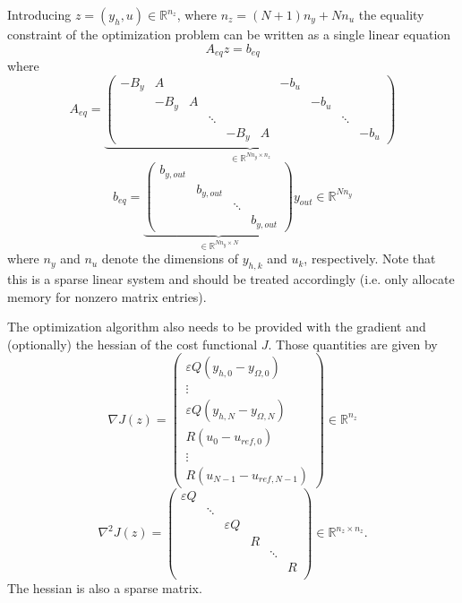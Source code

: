 \documentclass[
12pt, %
a4paper, %
onecolumn, %
portrait %
]{article}
\begin{document}
Introducing $z = (y_h, u) \in \mathbb{R}^{n_z}$, where $n_z = (N+1)n_y + N n_u$ the equality constraint of the optimization problem can be written as a single linear equation 
\begin{equation}
A_{eq} z = b_{eq}
\label{eq:linear-system-constraints}
\end{equation}
where
\begin{equation}
A_{eq} =
\underbrace{\begin{pmatrix}
-B_y & A & & & & & -b_u & & \\
& - B_y & A & & & & & -b_u & \\
& & & \ddots & & & & & \ddots \\
& & & & -B_y & A & & & & -b_u
\end{pmatrix}}_{
\in \mathbb{R}^{N n_y \times n_z}}
\end{equation}
\begin{equation}
b_{eq} = 
\underbrace{\begin{pmatrix}
b_{y,out} & & & \\
& b_{y,out} & &  \\
& & \ddots & \\
& & & b_{y,out}
\end{pmatrix}}_{
\in \mathbb{R}^{N n_y \times N}
}
 y_{out} \in \mathbb{R}^{N n_y}
\end{equation}
where $n_y$ and $n_u$ denote the dimensions of $y_{h,k}$ and $u_k$, respectively.
Note that this is a sparse linear system and should be treated accordingly (i.e. only allocate memory for nonzero matrix entries).

The optimization algorithm also needs to be provided with the gradient and (optionally) the hessian of the cost functional $J$. Those quantities are given by
\begin{equation}
\nabla J(z) = 
\begin{pmatrix}
\varepsilon Q (y_{h,0} - y_{\Omega,0}) \\
\vdots \\
\varepsilon Q (y_{h,N} - y_{\Omega,N}) \\
R (u_0 - u_{ref,0}) \\
\vdots \\
R (u_{N-1} - u_{ref,N-1})
\end{pmatrix} \in \mathbb{R}^{n_z}
\end{equation}
\begin{equation}
\nabla^2 J(z) = 
\begin{pmatrix}
\varepsilon Q & & & & &\\
& \ddots & & & &\\
& & \varepsilon Q & & &\\
& & & R & &\\
& & & & \ddots & \\
& & & & & R \\
\end{pmatrix} \in \mathbb{R}^{n_z \times n_z}.
\end{equation}
The hessian is also a sparse matrix.
\end{document}
